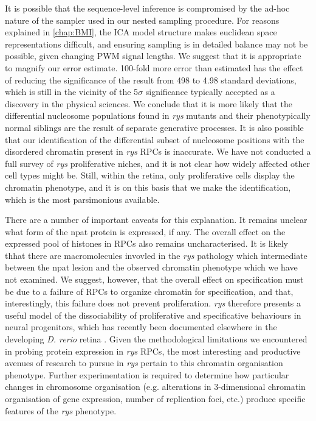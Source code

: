 It is possible that the sequence-level inference is compromised by the ad-hoc nature of the sampler used in our nested sampling procedure. For reasons explained in \autoref{chap:BMI}, the ICA model structure makes euclidean space representations difficult, and ensuring sampling is in detailed balance may not be possible, given changing PWM signal lengths. We suggest that it is appropriate to magnify our error estimate. 100-fold more error than estimated has the effect of reducing the significance of the result from 498 to 4.98 standard deviations, which is still in the vicinity of the 5$\sigma$ significance typically accepted as a discovery in the physical sciences. We conclude that it is more likely that the differential nucleosome populations found in \textit{rys} mutants and their phenotypically normal siblings are the result of separate generative processes. It is also possible that our identification of the differential subset of nucleosome positions with the disordered chromatin present in \textit{rys} RPCs is inaccurate. We have not conducted a full survey of \textit{rys} proliferative niches, and it is not clear how widely affected other cell types might be. Still, within the retina, only proliferative cells display the chromatin phenotype, and it is on this basis that we make the identification, which is the most parsimonious available. 

There are a number of important caveats for this explanation. It remains unclear what form of the npat protein is expressed, if any. The overall effect on the expressed pool of histones in RPCs also remains uncharacterised. It is likely thhat there are macromolecules invovled in the \textit{rys} pathology which intermediate between the npat lesion and the observed chromatin phenotype which we have not examined. We suggest, however, that the overall effect on specification must be due to a failure of RPCs to organize chromatin for specification, and that, interestingly, this failure does not prevent proliferation. \textit{rys} therefore presents a useful model of the dissociability of proliferative and specificative behaviours in neural progenitors, which has recently been documented elsewhere in the developing \textit{D. rerio} retina \cite{Engerer2017}. Given the methodological limitations we encountered in probing protein expression in \textit{rys} RPCs, the most interesting and productive avenues of research to pursue in \textit{rys} pertain to this chromatin organisation phenotype.  Further experimentation is required to determine how particular changes in chromosome organisation (e.g. alterations in 3-dimensional chromatin organisation of gene expression, number of replication foci, etc.) produce specific features of the \textit{rys} phenotype. 

